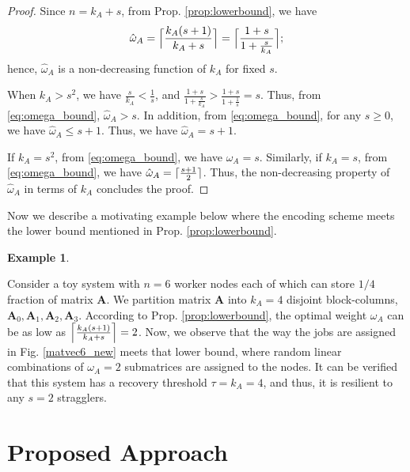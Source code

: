 \documentclass[conference]{IEEEtran}
\DeclarePairedDelimiter{\ceil}{\lceil}{\rceil}
\theoremstyle{definition}
\newtheorem{example}{Example}
\newcommand{\bfA}{\mathbf{A}}
\begin{document}
\begin{proof}
Since $n = k_A + s$, from Prop. \ref{prop:lowerbound}, we have 
\begin{align}
\label{eq:omega_bound}
    \hat{\omega}_A = \Bigl\lceil{\frac{k_A(s+1)}{k_A + s}}\Bigr\rceil = \Bigl\lceil{\frac{1 + s}{1 + \frac{s}{k_A}}}\Bigr\rceil ;
\end{align}hence, $\hat{\omega}_A$ is a non-decreasing function of $k_A$ for fixed $s$. 

 When $k_A > s^2$, we have $\frac{s}{k_A} < \frac{1}{s}$, and $\frac{1 + s}{1 + \frac{s}{k_A}} > \frac{1 + s}{1 + \frac{1}{s}} = s$. Thus, from \eqref{eq:omega_bound}, $\hat{\omega}_A > s$. In addition, from \eqref{eq:omega_bound}, for any $s \geq 0$, we have $\hat{\omega}_A \leq s + 1$. Thus, we have $\hat{\omega}_A = s + 1$.

 If $k_A = s^2$, from \eqref{eq:omega_bound}, we have $\hat{\omega}_A = s$. Similarly, if $k_A = s$, from \eqref{eq:omega_bound}, we have $\hat{\omega}_A = \ceil{\frac{s+1}{2}}$. Thus, the non-decreasing property of $\hat{\omega}_A$ in terms of $k_A$ concludes the proof.
\end{proof}

Now we describe a motivating example below where the encoding scheme meets the lower bound mentioned in Prop. \ref{prop:lowerbound}.

\begin{example}
\label{ex:toy_matvec}
%

Consider a toy system with $n = 6$ worker nodes each of which can store $1/4$ fraction of matrix $\bfA$. We partition matrix $\bfA$ into $k_A = 4$ disjoint block-columns, $\bfA_0, \bfA_1, \bfA_2, \bfA_3$. According to Prop. \ref{prop:lowerbound}, the optimal weight $\omega_A$ can be as low as $\Bigl\lceil\frac{k_A(s+1)}{k_A + s}\Bigr\rceil = 2$. Now, we observe that the way the jobs are assigned in Fig. \ref{matvec6_new} meets that lower bound, where random linear combinations of $\omega_A = 2$ submatrices are assigned to the nodes. It can be verified that this system has a recovery threshold $\tau = k_A = 4$, and thus, it is resilient to any $s = 2$ stragglers.
\end{example}


\section{Proposed Approach}
\label{sec:prop_approach}
\end{document}
